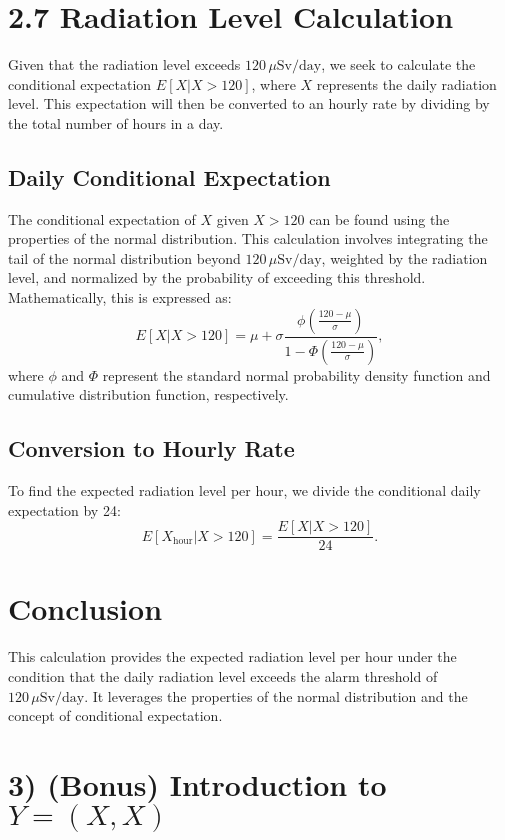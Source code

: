\documentclass{article}
\begin{document}
\section*{2.7 Radiation Level Calculation}

Given that the radiation level exceeds $120\, \mu\text{Sv}/\text{day}$, we seek to calculate the conditional expectation $E[X | X > 120]$, where $X$ represents the daily radiation level. This expectation will then be converted to an hourly rate by dividing by the total number of hours in a day.

\subsection*{Daily Conditional Expectation}

The conditional expectation of $X$ given $X > 120$ can be found using the properties of the normal distribution. This calculation involves integrating the tail of the normal distribution beyond $120\, \mu\text{Sv}/\text{day}$, weighted by the radiation level, and normalized by the probability of exceeding this threshold. Mathematically, this is expressed as:
\[ E[X | X > 120] = \mu + \sigma \frac{\phi\left(\frac{120 - \mu}{\sigma}\right)}{1 - \Phi\left(\frac{120 - \mu}{\sigma}\right)}, \]
where $\phi$ and $\Phi$ represent the standard normal probability density function and cumulative distribution function, respectively.

\subsection*{Conversion to Hourly Rate}

To find the expected radiation level per hour, we divide the conditional daily expectation by 24:
\[ E[X_{\text{hour}} | X > 120] = \frac{E[X | X > 120]}{24}. \]

\section*{Conclusion}

This calculation provides the expected radiation level per hour under the condition that the daily radiation level exceeds the alarm threshold of $120\, \mu\text{Sv}/\text{day}$. It leverages the properties of the normal distribution and the concept of conditional expectation.

\section*{3) (Bonus) Introduction to \(Y = (X, X)\)}
\end{document}
